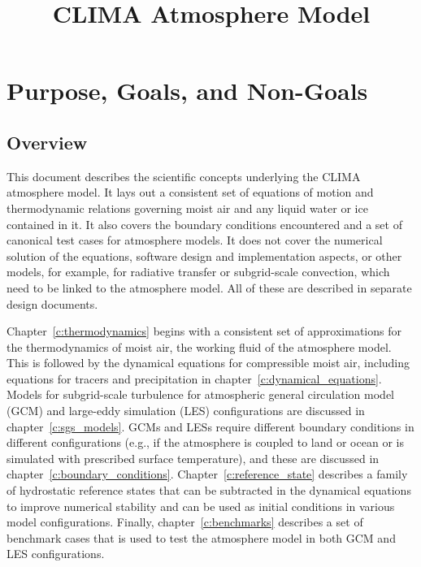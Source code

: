 \documentclass{report}
\title{CLIMA Atmosphere Model}
\author{ }
\begin{document}
\maketitle
\tableofcontents

\chapter{Purpose, Goals, and Non-Goals}

\section{Overview}

This document describes the scientific concepts underlying the CLIMA atmosphere model. It lays out a consistent set of equations of motion and thermodynamic relations governing moist air and any liquid water or ice contained in it. It also covers the boundary conditions encountered and a set of canonical test cases for atmosphere models. It does not cover the numerical solution of the equations, software design and implementation aspects, or other models, for example, for radiative transfer or subgrid-scale convection, which need to be linked to the atmosphere model. All of these are described in separate design documents. 

Chapter~\ref{c:thermodynamics} begins with a consistent set of approximations for the thermodynamics of moist air, the working fluid of the atmosphere model. This is followed by the dynamical equations for compressible moist air, including equations for tracers and precipitation in chapter~\ref{c:dynamical_equations}. %
Models for subgrid-scale turbulence for atmospheric general circulation model (GCM) and large-eddy simulation (LES) configurations are discussed in chapter~\ref{c:sgs_models}. GCMs and LESs require different boundary conditions in different configurations (e.g., if the atmosphere is coupled to land or ocean or is simulated with prescribed surface temperature), and these are discussed in chapter~\ref{c:boundary_conditions}. Chapter~\ref{c:reference_state} describes a family of hydrostatic reference states that can be subtracted in the dynamical equations to improve numerical stability and can be used as initial conditions in various model configurations. Finally, chapter~\ref{c:benchmarks} describes a set of benchmark cases that is used to test the atmosphere model in both GCM and LES configurations. 
\end{document}

